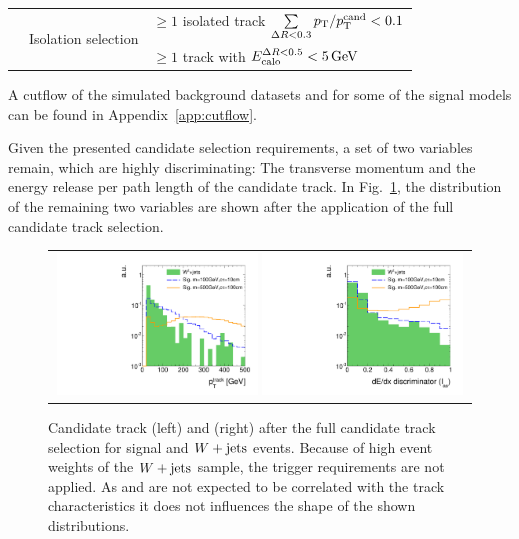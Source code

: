 \begin{table}[!h]
{\begin{tabular}{l|l|l}
                                                              &  \multirow{2}{*}{Isolation selection}      & $\geq1$ isolated track $\sum \limits_{\Delta R < 0.3} p_{\text{T}}/p_{\text{T}}^{\text{cand}} < 0.1$ \\
                                                              &                                            & $\geq1$ track with $E^{\Delta R<0.5}_{\text{calo}}<5\,\text{Ge}\kern-0.06667em\text{V}$ \\


\bottomrule
\end{tabular}}
\end{table}  


A cutflow of the simulated background datasets and for some of the signal models can be found in Appendix~\ref{app:cutflow}.


Given the presented candidate selection requirements, a set of two variables remain, which are highly discriminating:
The transverse momentum and the energy release per path length of the candidate track.
In Fig.~\ref{fig:PtAndIasAfterFullPreselection}, the distribution of the remaining two variables are shown after the application of the full candidate track selection.
\begin{figure}[!tb]
  \centering 
  \begin{tabular}{c}
    \includegraphics[width=0.49\textwidth]{figures/analysis/AnalysisSelection/chiTracksfullSelectionNoTriggerCuts_Wjets/htrackPtSmallRange_log.pdf}
    \includegraphics[width=0.49\textwidth]{figures/analysis/AnalysisSelection/chiTracksfullSelectionNoTriggerCuts_Wjets/htrackASmiSmallRange_log.pdf}
  \end{tabular}
  \caption{Candidate track \pt (left) and \ias (right) after the full candidate track selection for signal and $W+\text{jets}$ events. 
           Because of high event weights of the $W+\text{jets}$ sample, the trigger requirements are not applied.
           As \met and \ptfirstjet are not expected to be correlated with the track characteristics it does not influences the shape of the shown distributions.}
  \label{fig:PtAndIasAfterFullPreselection}
\end{figure}
